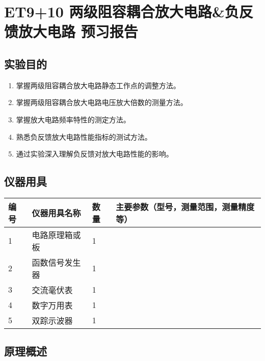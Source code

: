 \documentclass[dvipsnames, svgnames,a4paper,11pt]{article}
\begin{document}
	
	
	\clearpage
	\tableofcontents
	\clearpage
	
	
	
	
	\setcounter{section}{0}
	\section{ET9+10 \quad 两级阻容耦合放大电路\&负反馈放大电路 \quad\heiti 预习报告}
	
	\subsection{实验目的}
	\begin{enumerate}
		\item 掌握两级阻容耦合放大电路静态工作点的调整方法。
		\item 掌握两级阻容耦合放大电路电压放大倍数的测量方法。
		\item 掌握放大电路频率特性的测定方法。
		\item 熟悉负反馈放大电路性能指标的测试方法。
		\item 通过实验深入理解负反馈对放大电路性能的影响。
	\end{enumerate}
	
	\subsection{仪器用具}
	\begin{table}[htbp]
		\centering
		\renewcommand\arraystretch{1.6}
		\begin{tabular}{p{}|p{}|p{}|p{}}
			\hline
			编号& 仪器用具名称 & 数量 &  主要参数（型号，测量范围，测量精度等） \\
			\hline
			1&  电路原理箱或板& 1 &  \\
			\hline
			2&  函数信号发生器& 1 &  \\
			\hline
			3&  交流毫伏表& 1 &  \\
			\hline
			4&  数字万用表& 1 &  \\
			\hline
			5&  双踪示波器& 1 &  \\
			\hline
		\end{tabular}
	\end{table}
	
	\subsection{原理概述}
\end{document}
